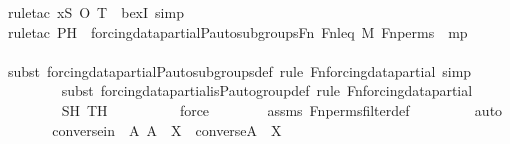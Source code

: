 \begin{isabellebody}
{\isacharparenleft}{\kern0pt}rule{\isacharunderscore}{\kern0pt}tac\ x{\isacharequal}{\kern0pt}{\isachardoublequoteopen}S\ O\ T{\isachardoublequoteclose}\ \ bexI{\isacharcomma}{\kern0pt}\ simp{\isacharparenright}{\kern0pt}\isanewline
\ \ \ \ \ \ \isamarkupfalse%
{\isacharparenleft}{\kern0pt}rule{\isacharunderscore}{\kern0pt}tac\ P{\isacharequal}{\kern0pt}{\isachardoublequoteopen}H\ {\isasymin}\ forcing{\isacharunderscore}{\kern0pt}data{\isacharunderscore}{\kern0pt}partial{\isachardot}{\kern0pt}P{\isacharunderscore}{\kern0pt}auto{\isacharunderscore}{\kern0pt}subgroups{\isacharparenleft}{\kern0pt}Fn{\isacharcomma}{\kern0pt}\ Fn{\isacharunderscore}{\kern0pt}leq{\isacharcomma}{\kern0pt}\ M{\isacharcomma}{\kern0pt}\ Fn{\isacharunderscore}{\kern0pt}perms{\isacharparenright}{\kern0pt}{\isachardoublequoteclose}\ \ mp{\isacharparenright}{\kern0pt}\isanewline
\ \ \ \ \ \ \ \isamarkupfalse%
{\isacharparenleft}{\kern0pt}subst\ forcing{\isacharunderscore}{\kern0pt}data{\isacharunderscore}{\kern0pt}partial{\isachardot}{\kern0pt}P{\isacharunderscore}{\kern0pt}auto{\isacharunderscore}{\kern0pt}subgroups{\isacharunderscore}{\kern0pt}def{\isacharcomma}{\kern0pt}\ rule\ Fn{\isacharunderscore}{\kern0pt}forcing{\isacharunderscore}{\kern0pt}data{\isacharunderscore}{\kern0pt}partial{\isacharcomma}{\kern0pt}\ simp{\isacharparenright}{\kern0pt}\isanewline
\ \ \ \ \ \ \ \isamarkupfalse%
{\isacharparenleft}{\kern0pt}subst\ forcing{\isacharunderscore}{\kern0pt}data{\isacharunderscore}{\kern0pt}partial{\isachardot}{\kern0pt}is{\isacharunderscore}{\kern0pt}P{\isacharunderscore}{\kern0pt}auto{\isacharunderscore}{\kern0pt}group{\isacharunderscore}{\kern0pt}def{\isacharcomma}{\kern0pt}\ rule\ Fn{\isacharunderscore}{\kern0pt}forcing{\isacharunderscore}{\kern0pt}data{\isacharunderscore}{\kern0pt}partial{\isacharparenright}{\kern0pt}\isanewline
\ \ \ \ \ \ \isamarkupfalse%
\ SH\ TH\ \isanewline
\ \ \ \ \ \ \ \isamarkupfalse%
\ force\isanewline
\ \ \ \ \ \ \isamarkupfalse%
\ assms\ Fn{\isacharunderscore}{\kern0pt}perms{\isacharunderscore}{\kern0pt}filter{\isacharunderscore}{\kern0pt}def\ \isanewline
\ \ \ \ \ \ \isamarkupfalse%
\ auto\isanewline
\ \ \isamarkupfalse%
\isanewline
\isanewline
\ \ \isamarkupfalse%
\ conversein\ {\isacharcolon}{\kern0pt}\ {\isachardoublequoteopen}{\isasymAnd}A{\isachardot}{\kern0pt}\ A\ {\isasymin}\ X\ {\isasymLongrightarrow}\ converse{\isacharparenleft}{\kern0pt}A{\isacharparenright}{\kern0pt}\ {\isasymin}\ X{\isachardoublequoteclose}\ \isanewline

\end{isabellebody}

